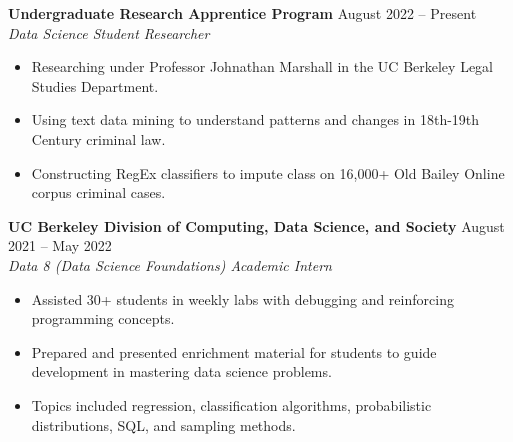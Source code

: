 \documentclass{article}
\begin{document}
    \begin{adjustwidth}{1em}{1em}


        \textbf{Undergraduate Research Apprentice Program} \hfill August 2022 -- Present
        \\ \textit{Data Science Student Researcher}
        \begin{itemize}
            \item Researching under Professor Johnathan Marshall in the UC Berkeley Legal Studies Department.
            \item Using text data mining to understand patterns and changes in 18th-19th Century criminal law.
            \item Constructing RegEx classifiers to impute class on 16,000+ Old Bailey Online corpus criminal cases.
        \end{itemize}

        \vspace{1mm}

        \textbf{UC Berkeley Division of Computing, Data Science, and Society} \hfill August 2021 -- May 2022
        \\ \textit{Data 8 (Data Science Foundations) Academic Intern}
        \begin{itemize}
            \item Assisted 30+ students in weekly labs with debugging and reinforcing programming concepts.
            \item Prepared and presented enrichment material for students to guide development in mastering data science problems.
            \item Topics included regression, classification algorithms, probabilistic distributions, SQL, and sampling methods.

        \end{itemize}

        
    \end{adjustwidth}

    

\end{document}
